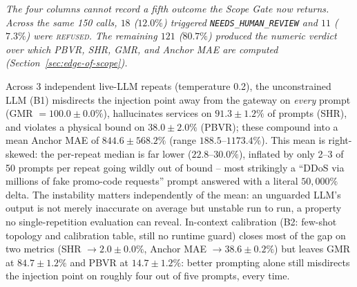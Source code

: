 \documentclass[journal, 10pt]{IEEEtran}
\begin{document}
\begin{table}[!t]
\centering
\caption{Parser reliability, live LLM, 50 prompts, mean $\pm$ std over 3 independent repeats}
\label{tab:rq1-parser}
\end{table}
\noindent\emph{The four columns cannot record a fifth outcome the Scope Gate now returns. Across the same 150 calls, $18$ ($12.0\%$) triggered \texttt{NEEDS\_HUMAN\_REVIEW} and $11$ ($7.3\%$) were \textsc{refused}. The remaining $121$ ($80.7\%$) produced the numeric verdict over which PBVR, SHR, GMR, and Anchor MAE are computed (Section~\ref{sec:edge-of-scope}).}

Across 3 independent live-LLM repeats (temperature 0.2), the unconstrained LLM (B1) misdirects the injection point away from the gateway on \emph{every} prompt (GMR $=100.0\pm0.0\%$), hallucinates services on $91.3\pm1.2\%$ of prompts (SHR), and violates a physical bound on $38.0\pm2.0\%$ (PBVR); these compound into a mean Anchor MAE of $844.6\pm568.2\%$ (range $188.5$--$1173.4\%$). This mean is right-skewed: the per-repeat median is far lower ($22.8$--$30.0\%$), inflated by only 2--3 of 50 prompts per repeat going wildly out of bound -- most strikingly a ``DDoS via millions of fake promo-code requests'' prompt answered with a literal $50{,}000\%$ delta. The instability matters independently of the mean: an unguarded LLM's output is not merely inaccurate on average but unstable run to run, a property no single-repetition evaluation can reveal. In-context calibration (B2: few-shot topology and calibration table, still no runtime guard) closes most of the gap on two metrics (SHR $\to2.0\pm0.0\%$, Anchor MAE $\to38.6\pm0.2\%$) but leaves GMR at $84.7\pm1.2\%$ and PBVR at $14.7\pm1.2\%$: better prompting alone still misdirects the injection point on roughly four out of five prompts, every time.
\end{document}
